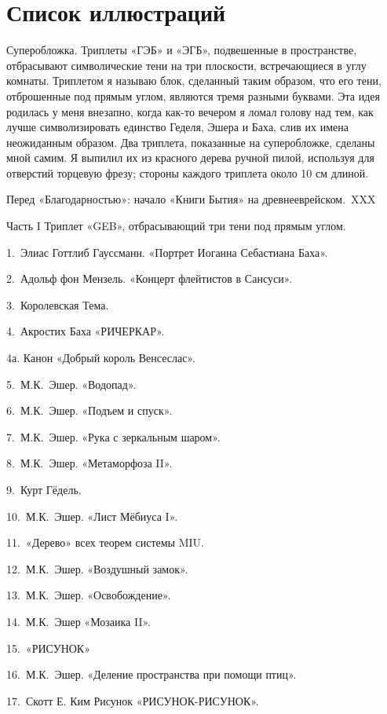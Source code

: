 \documentclass[../main.tex]{subfiles}
\begin{document}

\chapter{Список иллюстраций}

Суперобложка. Триплеты «ГЭБ» и «ЭГБ», подвешенные в пространстве, отбрасывают символические тени на три плоскости, встречающиеся в углу комнаты. Триплетом я называю блок, сделанный таким образом, что его тени, отброшенные под прямым углом, являются тремя разными буквами. Эта идея родилась у меня внезапно, когда как-то вечером я ломал голову над тем, как лучше символизировать единство Геделя, Эшера и Баха, слив их имена неожиданным образом. Два триплета, показанные на суперобложке, сделаны мной самим. Я выпилил их из красного дерева ручной пилой, используя для отверстий торцевую фрезу; стороны каждого триплета около 10 см длиной.

Перед «Благодарностью»: начало «Книги Бытия» на древнееврейском.~XXX

Часть I Триплет «GEB», отбрасывающий три тени под прямым углом.

1.~Элиас Готтлиб Гауссманн. «Портрет Иоганна Себастиана Баха».

2.~Адольф фон Мензель. «Концерт флейтистов в Сансуси».

3.~Королевская Тема.

4.~Акростих Баха «РИЧЕРКАР».

4а. Канон «Добрый король Венсеслас».

5.~М.К.~Эшер. «Водопад».

6.~М.К.~Эшер. «Подъем и спуск».

7.~М.К.~Эшер. «Рука с зеркальным шаром».

8.~М.К.~Эшер. «Метаморфоза II».

9.~Курт Гёдель.

10.~М.К.~Эшер. «Лист Мёбиуса I».

11.~«Дерево» всех теорем системы MIU.

12.~М.К.~Эшер. «Воздушный замок».

13.~М.К.~Эшер. «Освобождение».

14.~М.К.~Эшер «Мозаика II».

15.~«РИСУНОК»

16.~М.К.~Эшер. «Деление пространства при помощи птиц».

17.~Скотт Е. Ким Рисунок «РИСУНОК-РИСУНОК».
\end{document}

